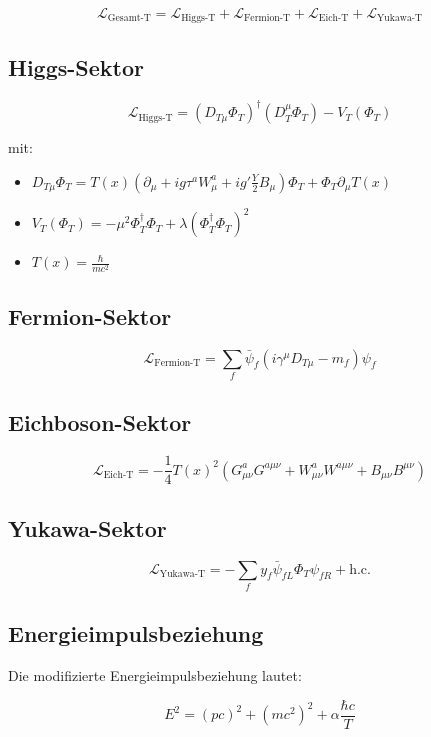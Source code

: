 \documentclass{article}
\begin{document}
	\begin{equation}
		\mathcal{L}_{\text{Gesamt-T}} = \mathcal{L}_{\text{Higgs-T}} + \mathcal{L}_{\text{Fermion-T}} + \mathcal{L}_{\text{Eich-T}} + \mathcal{L}_{\text{Yukawa-T}}
	\end{equation}
	
	\subsection{Higgs-Sektor}
	\begin{equation}
		\mathcal{L}_{\text{Higgs-T}} = (D_{T\mu} \Phi_T)^\dagger (D_T^\mu \Phi_T) - V_T(\Phi_T)
	\end{equation}
	
	mit:
	\begin{itemize}
		\item \( D_{T\mu} \Phi_T = T(x) (\partial_\mu + i g \tau^a W_\mu^a + i g' \frac{Y}{2} B_\mu) \Phi_T + \Phi_T \partial_\mu T(x) \)
		\item \( V_T(\Phi_T) = -\mu^2 \Phi_T^\dagger \Phi_T + \lambda (\Phi_T^\dagger \Phi_T)^2 \)
		\item \( T(x) = \frac{\hbar}{m c^2} \)
	\end{itemize}
	
	\subsection{Fermion-Sektor}
	\begin{equation}
		\mathcal{L}_{\text{Fermion-T}} = \sum_f \bar{\psi}_f (i \gamma^\mu D_{T\mu} - m_f) \psi_f
	\end{equation}
	
	\subsection{Eichboson-Sektor}
	\begin{equation}
		\mathcal{L}_{\text{Eich-T}} = -\frac{1}{4} T(x)^2 (G_{\mu\nu}^a G^{a\mu\nu} + W_{\mu\nu}^a W^{a\mu\nu} + B_{\mu\nu} B^{\mu\nu})
	\end{equation}
	
	\subsection{Yukawa-Sektor}
	\begin{equation}
		\mathcal{L}_{\text{Yukawa-T}} = -\sum_f y_f \bar{\psi}_{fL} \Phi_T \psi_{fR} + \text{h.c.}
	\end{equation}
	
	\subsection{Energieimpulsbeziehung}
	Die modifizierte Energieimpulsbeziehung lautet:
	
	\begin{equation}
		E^2 = (p c)^2 + (m c^2)^2 + \alpha \frac{\hbar c}{T}
	\end{equation}
	
\end{document}
